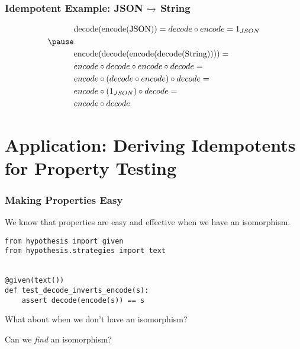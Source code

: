 \documentclass{beamer}
\begin{document}
\begin{frame}[fragile]
\frametitle{Idempotent Example: JSON {$\xhookrightarrow{}$} String}
\medskip
\begin{equation*}
\begin{aligned}
& \text{decode(encode(JSON))} = decode \circ encode = 1_{JSON} \\ \pause
& \\
& \text{encode(decode(encode(decode(String))))} = \\
& encode \circ decode \circ encode \circ decode = \\
& encode \circ (decode \circ encode) \circ decode = \\
& encode \circ (1_{JSON}) \circ decode = \\
& encode \circ decode \\
\end{aligned}
\end{equation*}
\end{frame}

\section{Application: Deriving Idempotents for Property Testing}

\begin{frame}[fragile]
\frametitle{Making Properties Easy}

We know that properties are easy and effective when we have 
an isomorphism. \\
\medskip

\begin{verbatim}
from hypothesis import given
from hypothesis.strategies import text


@given(text())
def test_decode_inverts_encode(s):
    assert decode(encode(s)) == s 
\end{verbatim}

\pause
\medskip
What about when we don't have an isomorphism? \\
\pause
\medskip

Can we \emph{find} an isomorphism?

\end{frame}
\end{document}
